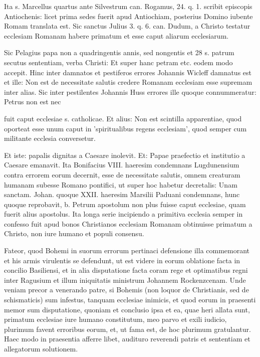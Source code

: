 \marginpar{\small[275]} Ita s. Marcellus quartus ante Silvestrum can. Rogamus, 24. q. 1. scribit episcopis Antiochenis: licet prima sedes fuerit apud Antiochiam, posterius Domino iubente Romam translata est. Sic sanctus Julius 3. q. 6. can. Dudum, a Christo testatur ecclesiam Romanam habere primatum et esse caput aliarum ecclesiarum.

Sic Pelagius papa non a quadringentis annis, sed nongentis et 28 s. patrum secutus sententiam, verba Christi: Et super hanc petram etc. eodem modo accepit. Hinc inter damnatos et pestiferos errores Johannis Wicleff damnatus est et ille: Non est de necessitate salutis credere Romanam ecclesiam esse supremam inter alias. Sic inter pestilentes Johannis Huss errores ille quoque connummeratur: Petrus non est nec

fuit caput ecclesiae s. catholicae. Et alius: Non est scintilla apparentiae, quod oporteat esse unum caput in 'spiritualibus regens ecclesiam', quod semper cum militante ecclesia conversetur.

Et iste: papalis dignitas a Caesare inolevit. Et: Papae praefectio et institutio a Caesare emanavit. Ita Bonifacius VIII. haeresim condemnans Lugdunensium contra errorem eorum decernit, esse de necessitate salutis, omnem creaturam humanam subesse Romano pontifici, ut super hoc habetur decretalis: Unam sanctam. Johan. quoque XXII. haeresim Marsilii Paduani condemnans, hunc quoque reprobavit, b. Petrum apostolum non plus fuisse caput ecclesiae, quam fuerit alius apostolus. Ita longa serie incipiendo a primitiva ecclesia semper in confesso fuit apud bonos Christianos ecclesiam Romanam obtinuisse primatum a Christo, non iure humano et populi consensu.

Fateor, quod Bohemi in suorum errorum pertinaci defensione illa commemorant et his armis virulentis se defendunt, ut est videre in eorum oblatione facta in concilio Basiliensi, et in alia disputatione facta coram rege et optimatibus regni inter Ragusium et illum iniquitatis ministrum Johannem Rockenzcenam. Unde veniam precor a venerando patre, si Bohemis (non loquor de Christianis, sed de schismaticis) sum infestus, tanquam ecclesiae inimicis, et quod eorum in praesenti memor sum disputatione, quoniam et conclusio ipsa et ea, quae heri allata sunt, primatum ecclesiae iure humano constitutum, meo parvo et exili iudicio, plurimum favent erroribus eorum, et, ut fama est, de hoc plurimum gratulantur. Haec modo in praesentia afferre libet, audituro reverendi patris et sententiam et allegatorum solutionem.

